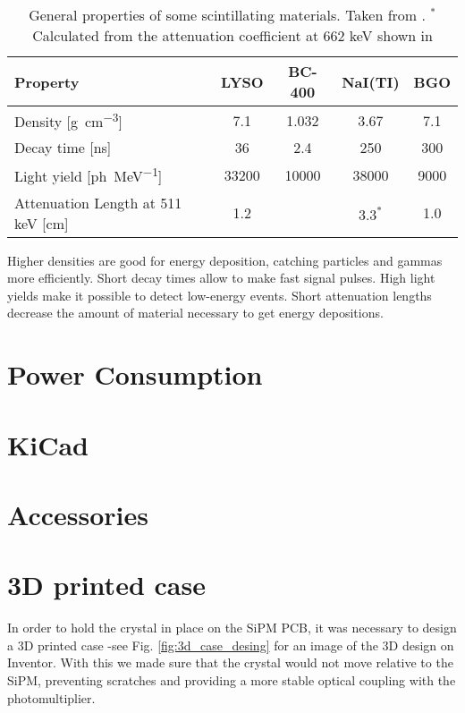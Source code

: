 \begin{table}[htb]
  \caption{General properties of some scintillating materials. Taken from \cite{mukhopadhyay2004plastic,Luxium_LYSO,Luxium_plastic,SaintGobain_NaI}. $^*$Calculated from the attenuation coefficient at 662 \unit{\kilo\eV} shown in \cite[p.~3]{SaintGobain_NaI}}
  \centering
  \begin{tabular}{ l c c c c}
    \midrule
    Property & LYSO & BC-400 & NaI(TI) & BGO\\
    \midrule
    Density [\unit{\g\per\cm\cubed}] & 7.1 & 1.032 & 3.67 & 7.1\\
    Decay time [\unit{\nano\s}]  & 36 & 2.4 & 250 & 300\\
    Light yield [\unit{ph\per\mega\eV}] & 33200 & 10000 & 38000 & 9000\\
    Attenuation Length at 511 \unit{\kilo\eV} [\unit{\cm}] & 1.2 &  & $3.3^{*}$ & 1.0\\
    \bottomrule
  \end{tabular}
  \label{tab:scintillators}
\end{table}

Higher densities are good for energy deposition, catching particles and gammas more efficiently. Short decay times allow to make fast signal pulses. High light yields make it possible to detect low-energy events. Short attenuation lengths decrease the amount of material necessary to get energy depositions.

\section{Power Consumption}

\section{KiCad}

\section{Accessories}

\section{3D printed case}

In order to hold the crystal in place on the SiPM PCB, it was necessary to design a 3D printed case -see Fig. \ref{fig:3d_case_desing} for an image of the 3D design on Inventor. With this we made sure that the crystal would not move relative to the SiPM, preventing scratches and providing a more stable optical coupling with the photomultiplier.

